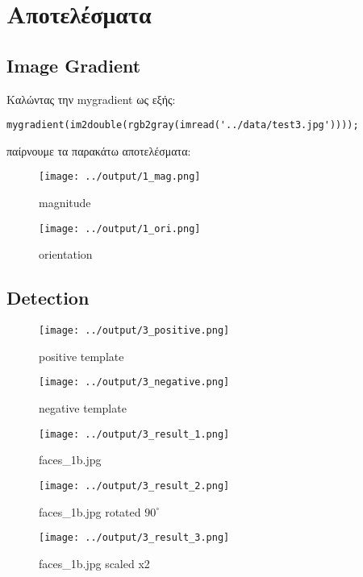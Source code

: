 \documentclass[11pt]{scrartcl} %
\begin{document}
\section{Αποτελέσματα}

\subsection{Image Gradient}

Καλώντας την mygradient ως εξής:

\begin{verbatim}
mygradient(im2double(rgb2gray(imread('../data/test3.jpg'))));
\end{verbatim}

παίρνουμε τα παρακάτω αποτελέσματα:

\begin{figure}[H]
  \texttt{[image: ../output/1\_mag.png]}
  \caption{magnitude}
\end{figure}

\begin{figure}[H]
  \texttt{[image: ../output/1\_ori.png]}
  \caption{orientation}
\end{figure}

\subsection{Detection}

\begin{figure}[H]
  \texttt{[image: ../output/3\_positive.png]}
  \caption{positive template}
\end{figure}

\begin{figure}[H]
  \texttt{[image: ../output/3\_negative.png]}
  \caption{negative template}
\end{figure}

\begin{figure}[H]
  \texttt{[image: ../output/3\_result\_1.png]}
  \caption{faces\_1b.jpg}
\end{figure}

\begin{figure}[H]
  \texttt{[image: ../output/3\_result\_2.png]}
  \caption{faces\_1b.jpg rotated $90^{\circ}$}
\end{figure}

\begin{figure}[H]
  \texttt{[image: ../output/3\_result\_3.png]}
  \caption{faces\_1b.jpg scaled x2}
\end{figure}
\end{document}
